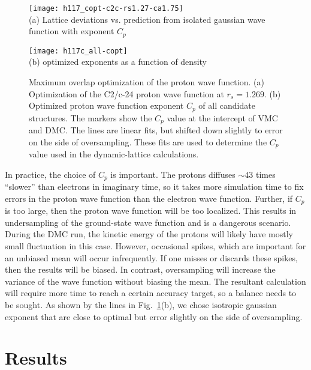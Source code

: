 \begin{figure}[h]
\centering
\begin{minipage}{0.49\textwidth}
\centering
\texttt{[image: h117\_copt-c2c-rs1.27-ca1.75]}\\
(a) Lattice deviations vs. prediction from isolated gaussian wave function with exponent $C_p$
\end{minipage}
\begin{minipage}{0.49\textwidth}
\centering
\texttt{[image: h117c\_all-copt]}\\
(b) optimized exponents as a function of density
\end{minipage}
\caption{Maximum overlap optimization of the proton wave function. (a) Optimization of the C2/c-24 proton wave function at $r_s=1.269$. (b) Optimized proton wave function exponent $C_p$ of all candidate structures. The markers show the $C_p$ value at the intercept of VMC and DMC. The lines are linear fits, but shifted down slightly to error on the side of oversampling. These fits are used to determine the $C_p$ value used in the dynamic-lattice calculations.}
\label{fig:prot-cp-opt}
\end{figure}

In practice, the choice of $C_p$ is important.
The protons diffuses $\sim 43$ times ``slower'' than electrons in imaginary time, so it takes more simulation time to fix errors in the proton wave function than the electron wave function.
Further, if $C_p$ is too large, then the proton wave function will be too localized.
This results in undersampling of the ground-state wave function and is a dangerous scenario.
During the DMC run, the kinetic energy of the protons will likely have mostly small fluctuation in this case.
However, occasional spikes, which are important for an unbiased mean will occur infrequently.
If one misses or discards these spikes, then the results will be biased.
In contrast, oversampling will increase the variance of the wave function without biasing the mean.
The resultant calculation will require more time to reach a certain accuracy target, so a balance needs to be sought.
As shown by the lines in Fig.~\ref{fig:prot-cp-opt}(b), we chose isotropic gaussian exponent that are close to optimal but error slightly on the side of oversampling.

\section{Results}
\label{sec:hsolid-results}

